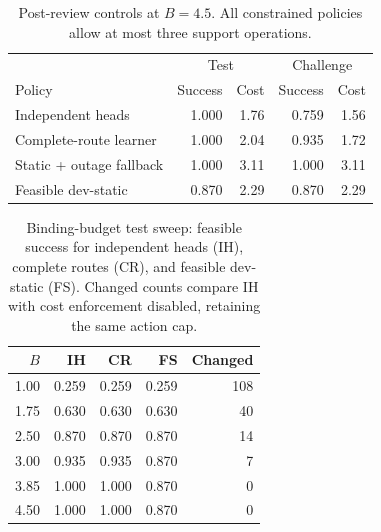 \begin{table}[t]\centering\small
\caption{Post-review controls at $B=4.5$. All constrained policies allow at most three support operations.}
\label{tab:revision}
\begin{tabular}{lrrrr}\toprule
 & \multicolumn{2}{c}{Test} & \multicolumn{2}{c}{Challenge} \\
Policy & Success & Cost & Success & Cost \\\midrule
Independent heads & 1.000 & 1.76 & 0.759 & 1.56 \\
Complete-route learner & 1.000 & 2.04 & 0.935 & 1.72 \\
Static + outage fallback & 1.000 & 3.11 & 1.000 & 3.11 \\
Feasible dev-static & 0.870 & 2.29 & 0.870 & 2.29 \\
\bottomrule\end{tabular}\end{table}
\begin{table}[t]\centering\small
\caption{Binding-budget test sweep: feasible success for independent heads (IH), complete routes (CR), and feasible dev-static (FS). Changed counts compare IH with cost enforcement disabled, retaining the same action cap.}
\label{tab:budgets}
\begin{tabular}{rrrrr}\toprule
$B$ & IH & CR & FS & Changed \\\midrule
1.00 & 0.259 & 0.259 & 0.259 & 108 \\
1.75 & 0.630 & 0.630 & 0.630 & 40 \\
2.50 & 0.870 & 0.870 & 0.870 & 14 \\
3.00 & 0.935 & 0.935 & 0.870 & 7 \\
3.85 & 1.000 & 1.000 & 0.870 & 0 \\
4.50 & 1.000 & 1.000 & 0.870 & 0 \\
\bottomrule\end{tabular}\end{table}
